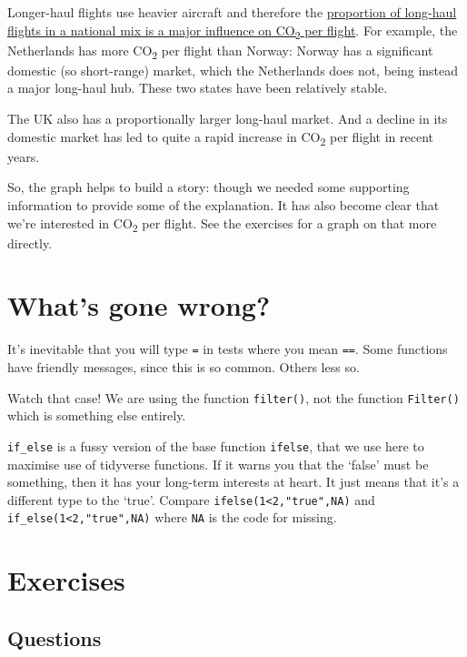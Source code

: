 \documentclass[
]{book}
\begin{document}
Longer-haul flights use heavier aircraft and therefore the \href{https://www.eurocontrol.int/publication/eurocontrol-data-snapshot-co2-emissions-flight-distance}{proportion of long-haul flights in a national mix is a major influence on CO\textsubscript{2} per flight}. For example, the Netherlands has more CO\textsubscript{2} per flight than Norway: Norway has a significant domestic (so short-range) market, which the Netherlands does not, being instead a major long-haul hub. These two states have been relatively stable.

The UK also has a proportionally larger long-haul market. And a decline in its domestic market has led to quite a rapid increase in CO\textsubscript{2} per flight in recent years.

So, the graph helps to build a story: though we needed some supporting information to provide some of the explanation. It has also become clear that we're interested in CO\textsubscript{2} per flight. See the exercises for a graph on that more directly.

\hypertarget{whats-gone-wrong-3}{%
\section{What's gone wrong?}\label{whats-gone-wrong-3}}

It's inevitable that you will type \texttt{=} in tests where you mean \texttt{==}. Some functions have friendly messages, since this is so common. Others less so.

Watch that case! We are using the function \texttt{filter()}, not the function \texttt{Filter()} which is something else entirely.

\texttt{if\_else} is a fussy version of the base function \texttt{ifelse}, that we use here to maximise use of tidyverse functions. If it warns you that the `false' must be something, then it has your long-term interests at heart. It just means that it's a different type to the `true'. Compare \texttt{ifelse(1\textless{}2,"true",NA)} and \texttt{if\_else(1\textless{}2,"true",NA)} where \texttt{NA} is the code for missing.

\hypertarget{exercises}{%
\section{Exercises}\label{exercises}}

\hypertarget{questions-2}{%
\subsection{Questions}\label{questions-2}}
\end{document}
